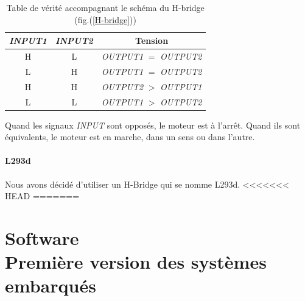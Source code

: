 \documentclass[a4paper,12pt]{report}
\begin{document}
{\begin{table}%
\begin{center}
  \begin{tabular}{c|c||c}  
    \emph{INPUT1} & \emph{INPUT2}
    & Tension\\
    \hline
    H & L & \emph{OUTPUT1} $=$ \emph{OUTPUT2}\\
    L & H & \emph{OUTPUT1} $=$ \emph{OUTPUT2}\\
    H & H & \emph{OUTPUT2} $>$ \emph{OUTPUT1}\\
    L & L & \emph{OUTPUT1} $>$ \emph{OUTPUT2}\\
  \end{tabular}
\end{center}

\caption{\label{tableDeVerite} Table de v\'erit\'e accompagnant le sch\'ema du
H-bridge (fig.(\ref{H-bridge}))}

\small Quand les signaux \emph{INPUT} sont oppos\'es, le moteur est \`a
l'arr\^et. Quand ils sont \'equivalents, le moteur est en marche, dans un sens
ou dans l'autre.\normalsize
\end{table}

\subsubsection{L293d}
Nous avons décidé d'utiliser un H-Bridge qui se nomme L293d.
<<<<<<< HEAD
=======





\chapter{Software \\  Première version des systèmes embarqués}

}
\end{document}
